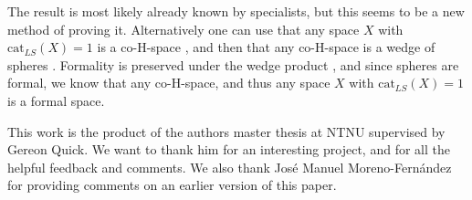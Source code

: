 The result is most likely already known by specialists, but this seems to be a new method 
of proving it. Alternatively one can use that any space $X$ with $\text{cat}_{LS}(X)=1$ 
is a co-H-space \cite{hess}, and then that any co-H-space is a wedge of spheres 
\cite{co-H-space}. Formality is preserved under the wedge product \cite{hess}, and since 
spheres are formal, we know that any co-H-space, and thus any space $X$ with 
$\text{cat}_{LS}(X)=1$ is a formal space. 

\begin{acknowledgements}
This work is the product of the authors master thesis at NTNU
supervised by Gereon Quick. We want to thank him for an interesting project, and for 
all the helpful feedback and comments. We also thank José Manuel Moreno-Fernández for 
providing comments on an earlier version of this paper. 
\end{acknowledgements}